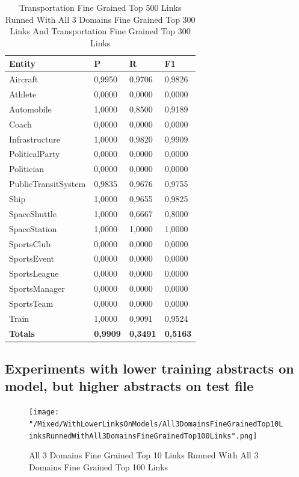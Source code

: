 \documentclass[thesis=M,english]{FITthesis}[2018/05/30]
\begin{document}
\begin{table}[H]\centering
		\label{}
		\begin{tabular}{|l|l|l|l|}
			\hline {\textbf{Entity}} & {\textbf{P}} & {\textbf{R}} & {\textbf{F1}}\\\hline
				Aircraft & 0,9950 & 0,9706 & 0,9826\\
				Athlete & 0,0000 & 0,0000 & 0,0000\\
				Automobile & 1,0000 & 0,8500 & 0,9189\\ 
				Coach & 0,0000 & 0,0000 & 0,0000\\
				Infrastructure & 1,0000 & 0,9820 & 0,9909\\
				PoliticalParty & 0,0000 & 0,0000 & 0,0000\\
				Politician & 0,0000 & 0,0000 & 0,0000\\
				PublicTransitSystem & 0,9835 & 0,9676 & 0,9755\\
				Ship & 1,0000 & 0,9655 & 0,9825\\
				SpaceShuttle & 1,0000 & 0,6667 & 0,8000\\
				SpaceStation & 1,0000 & 1,0000 & 1,0000\\ 
				SportsClub & 0,0000 & 0,0000 & 0,0000\\
				SportsEvent & 0,0000 & 0,0000 & 0,0000\\
				SportsLeague & 0,0000 & 0,0000 & 0,0000\\
				SportsManager & 0,0000 & 0,0000 & 0,0000\\
				SportsTeam & 0,0000 & 0,0000 & 0,0000\\
				Train & 1,0000 & 0,9091 & 0,9524\\\hline
				\textbf{Totals} & \textbf{0,9909} & \textbf{0,3491} & \textbf{0,5163}\\\hline
		\end{tabular}
		\caption{Transportation Fine Grained Top 500 Links Runned With All 3 Domains Fine Grained Top 300 Links And Transportation Fine Grained Top 300 Links}
	\end{table}
	
\subsection{Experiments with lower training abstracts on model, but higher abstracts on test file}	
	\begin{figure}[H]\centering
		\texttt{[image: "/Mixed/WithLowerLinksOnModels/All3DomainsFineGrainedTop10LinksRunnedWithAll3DomainsFineGrainedTop100Links".png]}
		\caption{All 3 Domains Fine Grained Top 10 Links Runned With All 3 Domains Fine Grained Top 100 Links}\label{}
	\end{figure}
	
\end{document}
